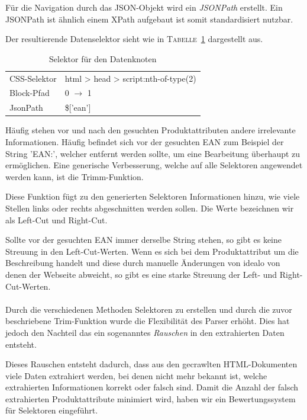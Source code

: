 Für die Navigation durch das JSON-Objekt wird ein \textit{JSONPath} erstellt.
Ein JSONPath ist ähnlich einem XPath aufgebaut ist somit standardisiert nutzbar.

Der resultierende Datenselektor sieht wie in \textsc{Tabelle}~\ref{tab:datenselektor} dargestellt aus.

\begin{table}[h]
    \centering
    \begin{tabular}{ l | l }
        CSS-Selektor &  html > head > script:nth-of-type(2)\\
        Block-Pfad   &  0 $\rightarrow$ 1\\
        JsonPath     &  \$['ean']
    \end{tabular}
    \caption{Selektor für den  Datenknoten}
    \label{tab:datenselektor}
    \vspace{-0.5cm}
\end{table}

Häufig stehen vor und nach den gesuchten Produktattributen andere irrelevante Informationen.
Häufig befindet sich vor der gesuchten EAN zum Beispiel der String 'EAN:\textvisiblespace', welcher entfernt
werden sollte, um eine Bearbeitung überhaupt zu ermöglichen.
Eine generische Verbesserung, welche auf alle Selektoren angewendet werden kann, ist die Trimm-Funktion.

Diese Funktion fügt zu den generierten Selektoren Informationen hinzu, wie viele Stellen links oder rechts
abgeschnitten werden sollen.
Die Werte bezeichnen wir als Left-Cut und Right-Cut.

Sollte vor der gesuchten EAN immer derselbe String stehen, so gibt es keine Streuung in den Left-Cut-Werten.
Wenn es sich bei dem Produktattribut um die Beschreibung handelt und diese durch manuelle Änderungen von idealo von
denen der Webseite abweicht, so gibt es eine starke Streuung der Left- und Right-Cut-Werten.
\\
~~\\
Durch die verschiedenen Methoden Selektoren zu erstellen und durch die zuvor beschriebene Trim-Funktion wurde die
Flexibilität des Parser erhöht.
Dies hat jedoch den Nachteil das ein sogenanntes \textit{Rauschen} in den extrahierten Daten entsteht.

Dieses Rauschen entsteht dadurch, dass aus den gecrawlten HTML-Dokumenten viele Daten extrahiert werden,
bei denen nicht mehr bekannt ist, welche extrahierten Informationen korrekt oder falsch sind.
Damit die Anzahl der falsch extrahierten Produktattribute minimiert wird, haben wir ein Bewertungssystem für
Selektoren eingeführt.

